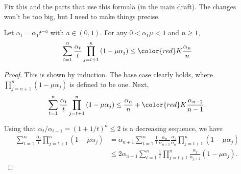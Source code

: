 {\color{blue}Fix this and the parts that use this formula (in the main draft). 
The changes won't be too big, but I need to make things precise. 
}
\begin{proposition}\label{prop:induction_size}
    Let $\alpha_t = \alpha_1 t^{-a}$ with $a \in (0, 1)$.
    For any $0 < \alpha_1 \mu < 1$ and $n \geq 1$, 
    \begin{equation}
        \sum_{t=1}^n \frac{\alpha_t}{t} \prod_{j=t+1}^n \left(1 - \mu \alpha_j \right) 
            \leq {\color{red}K}\frac{\alpha_n}{n}
    \end{equation}
\end{proposition}

\begin{proof}
    This is shown by induction.
    The base case clearly holds, where $\prod_{j=n+1}^n (1 - \mu \alpha_j)$ is defined to be one. 
    Next,
    \begin{align*}
        \sum_{t=1}^n \frac{\alpha_t}{t} \prod_{j=t+1}^n \left(1 - \mu \alpha_j\right) 
        \leq 
        \frac{\alpha_n}{n} + {\color{red}K} \frac{\alpha_{n-1}}{n-1} .
    \end{align*}

    Using that $\alpha_t/\alpha_{t+1} = (1 + 1/t)^a \leq 2$ is a decreasing sequence, we have
    \begin{align*}
        \sum_{t=1}^n \frac{\alpha_t}{t} \prod_{j=t+1}^n \left(1 - \mu \alpha_j \right) 
        &= \alpha_{n+1} \sum_{t=1}^n \frac{1}{t}\frac{\alpha_{n}}{\alpha_{n+1}} \frac{\alpha_t}{\alpha_n} \prod_{j=t+1}^n \left(1 - \mu \alpha_j \right) 
        \\
        & \leq 2 \alpha_{n+1} \sum_{t=1}^n \frac{1}{t} \prod_{j=t+1}^n \frac{\alpha_j}{\alpha_{j+1}} \left(1 - \mu \alpha_j\right) .
    \end{align*}
    

\end{proof}
